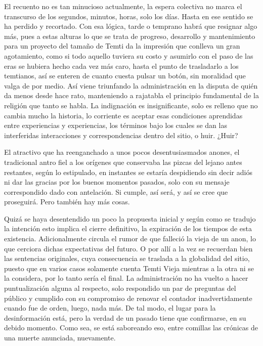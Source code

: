 \documentclass[
  spanish,
]{book}
\begin{document}
El recuento no es tan minucioso actualmente, la espera colectiva no marca el transcurso de los segundos, minutos, horas, solo los días. Hasta en ese sentido se ha perdido y recortado. Con esa lógica, tarde o temprano habrá que resignar algo más, pues a estas alturas lo que se trata de progreso, desarrollo y mantenimiento para un proyecto del tamaño de Temti da la impresión que conlleva un gran agotamiento, como si todo aquello tuviera su costo y asumirlo con el paso de las eras se hubiera hecho cada vez más caro, hasta el punto de trasladarlo a los temtianos, así se enteren de cuanto cuesta pulsar un botón, sin moralidad que valga de por medio. Así viene triunfando la administración en la disputa de quién da menos desde hace rato, manteniendo a rajatabla el principio fundamental de la religión que tanto se habla. La indignación es insignificante, solo es relleno que no cambia mucho la historia, lo corriente es aceptar esas condiciones aprendidas entre experiencias y experiencias, los términos bajo los cuales se dan las interferidas interacciones y correspondencias dentro del sitio, o huir. ¿Huir?

El atractivo que ha reenganchado a unos pocos desentusiasmados anones, el tradicional antro fiel a los orígenes que conservaba las pizcas del lejano antes restantes, según lo estipulado, en instantes se estaría despidiendo sin decir adiós ni dar las gracias por los buenos momentos pasados, solo con su mensaje correspondido dado con antelación. Si cumple, así será, y así se cree que proseguirá. Pero también hay más cosas.

Quizá se haya desentendido un poco la propuesta inicial y según como se tradujo la intención esto implica el cierre definitivo, la expiración de los tiempos de esta existencia. Adicionalmente circula el rumor de que falleció la vieja de un anon, lo que cerciora dichas expectativas del futuro. O por allí a la vez se recuerdan bien las sentencias originales, cuya consecuencia se traslada a la globalidad del sitio, puesto que en varios casos solamente cuenta Temti Vieja mientras a la otra ni se la considera, por lo tanto sería el final. La administración no ha vuelto a hacer puntualización alguna al respecto, solo respondido un par de preguntas del público y cumplido con su compromiso de renovar el contador inadvertidamente cuando fue de orden, luego, nada más. De tal modo, el lugar para la desinformación está, pero la verdad de un pasado tiene que confirmarse, en su debido momento. Como sea, se está saboreando eso, entre comillas las crónicas de una muerte anunciada, nuevamente.
\end{document}
